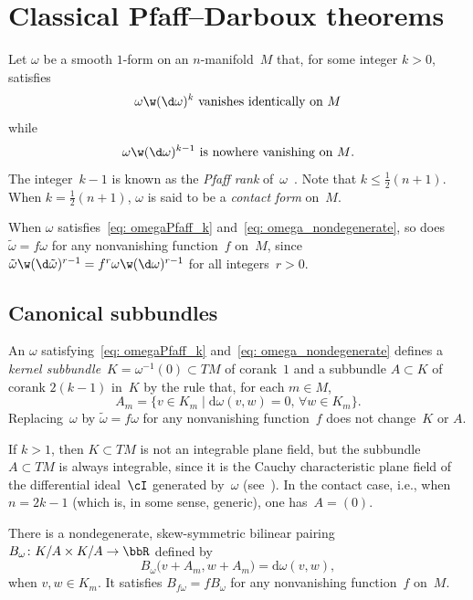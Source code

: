 \section{Classical Pfaff--Darboux theorems}
Let $\omega$ be a smooth $1$-form on an $n$-manifold~$M$
that, for some integer $k>0$, satisfies
\begin{equation}\label{eq: omegaPfaff_k}
\text{$\omega\w(\d\omega)^k$ vanishes identically on $M$}
\end{equation}
while
\begin{equation}\label{eq: omega_nondegenerate}
\text{$\omega\w(\d\omega)^{k-1}$ is nowhere vanishing on $M$.}
\end{equation}
The integer~$k{-}1$ is known as the \emph{Pfaff rank}
of~$\omega$~\cite[Chapter II, Section~3]{MR1083148}.
Note that $k\le \tfrac12(n{+}1)$. When $k=\tfrac12(n{+}1)$,
$\omega$ is said to be a \emph{contact form} on~$M$.

When $\omega$ satisfies~\eqref{eq: omegaPfaff_k}
and~\eqref{eq: omega_nondegenerate}, so does $\tilde\omega=f\omega$
for any nonvanishing function~$f$ on~$M$,
since $\tilde\omega\w(\d\tilde\omega)^{r-1} = f^r \omega\w(\d\omega)^{r-1}$
for all integers~$r>0$.

\subsection{Canonical subbundles}
An $\omega$ satisfying~\eqref{eq: omegaPfaff_k}
and~\eqref{eq: omega_nondegenerate} defines a \emph{kernel subbundle}~$K
= \omega^{-1}(0)\subset TM$ of corank~$1$
and a subbundle $A\subset K$ of corank $2(k{-}1)$ in~$K$
by the rule that, for each $m\in M$,
\begin{equation*}
A_m = \{ v\in K_m\mid \mathrm{d}\omega(v,w) = 0,\, \forall w\in K_m \}.
\end{equation*}
Replacing~$\omega$ by $\tilde\omega= f \omega$ for any nonvanishing
function~$f$ does not change~$K$ or $A$.

If $k>1$, then $K\subset TM$ is not an integrable plane field,
but the subbundle $A\subset TM$ is always integrable,
since it is the Cauchy characteristic plane field
of the differential ideal~$\cI$ generated by~$\omega$
(see~\cite[Chapter II, Proposition~2.1]{MR1083148}).
In the contact case, i.e., when $n=2k{-}1$ (which is,
in some sense, generic), one has~$A=(0)$.

There is a nondegenerate, skew-symmetric bilinear pairing
$B_\omega \colon K{/}A\times K{/}A\to\bbR$
defined by
\[
B_\omega\bigl(v{+}A_m,w{+}A_m\bigr) = \mathrm{d}\omega(v,w),
\]
when $v,w\in K_m$. It satisfies $B_{f\omega} = fB_\omega$
for any nonvanishing function~$f$ on~$M$.

